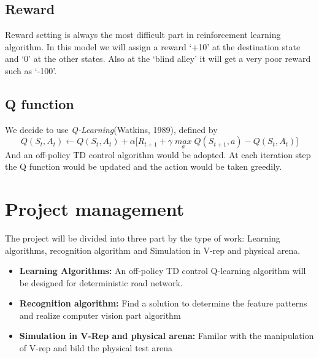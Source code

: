 \documentclass[
11pt, %
a4paper, %
oneside, %
headinclude%
BCOR3mm, %
]{scrartcl}
\begin{document}
\subsection{Reward}
\quad Reward setting is always the most difficult part in reinforcement learning algorithm. 
In this model we will assign a reward ‘+10’ at the destination state and ‘0’ at the other states. 
Also at the ‘blind alley’ it will get a very poor reward such as ‘-100’.



\subsection{Q function}
\quad
We decide to use \textsl{Q-Learning}(Watkins, 1989)\cite{sutton1998reinforcement}, defined by
\begin{equation}
\mathit{Q(S_t,A_t)\xleftarrow{}  Q(S_t,A_t)+ }\alpha \mathit{[ R_{t+1} + }\gamma \mathit{\max \limits_{a}Q(S_{t+1},a)-Q(S_t,A_t)]}
\end{equation}
\quad And an off-policy TD control algorithm would be adopted.
At each iteration step the Q function would be updated and the action would be taken greedily.



\section{Project management}
\quad The project will be divided into three part by the type of work: Learning algorithms, recognition algorithm and Simulation in V-rep and physical arena.

\begin{itemize}[noitemsep]
\item \textbf{Learning Algorithms:} An off-policy TD control Q-learning algorithm will be designed for deterministic road network.
\item \textbf{Recognition algorithm:} Find a solution to determine the feature patterns and realize computer vision part algorithm 
\item \textbf{Simulation in V-Rep and physical arena:}	Familar with the manipulation of V-rep and bild the physical test arena
\end{itemize}
\end{document}

